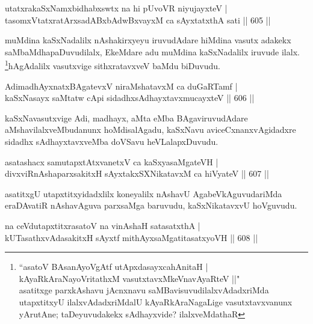 
\begin{shl}
utatxrakaSxNamxbidhabxswtx na hi pUvoVR niyujayxteV | \\
tasomxVtatxratArxsadABxbAdwBxvayxM ca sAyxtatxthA sati \hfill||  605 ||  
\end{shl}

\begin{artha}
muMdina kaSxNadalilx nAshakirxyeyu iruvudAdare hiMdina vasutx adakekx saMbaMdhapaDuvudilalx, EkeMdare adu muMdina kaSxNadalilx iruvude ilalx. \footnote[1]{``asatoV BAsanAyoVgAtf utApxdasayxcahAnitaH |\\
kAyaRkAraNayoVritathxM vasutxtavxMkeVnavAyaRteV ||"\\asatitxge parxkAshavu jAcnxnavu saMBavisuvudilalxvAdadxriMda utapxtitxyU ilalxvAdadxriMdalU kAyaRkAraNagaLige vasutxtavxvanunx yArutAne; taDeyuvudakekx sAdhayxvide? ilalxveMdathaR}hAgAdalilx vasutxvige sithxratavxveV baMdu biDuvudu.
\end{artha}

\begin{shl}
AdimadhAyxnatxBAgatevxV niraMshatavxM ca duGaRTamf | \\
kaSxNasayx saMtatw cApi sidadhxsAdhayxtavxmucayxteV \hfill||  606 ||  
\end{shl}

\begin{artha}
kaSxNavasutxvige Adi, madhayx, aMta eMba BAgaviruvudAdare aMshavilalxveMbudanunx hoMdisalAgadu, kaSxNavu aviceCxnanxvAgidadxre sidadhx sAdhayxtavxveMba doVSavu heVLalapxDuvudu.
\end{artha}

\begin{shl}
asatashacx samutapxtAtxvanetxV ca kaSxyasaMgateVH | \\
divxviRnAshaparxsakitxH sAyxtakxSXNikatavxM ca hiVyateV \hfill||  607 ||  
\end{shl}	

\begin{artha}
asatitxgU utapxtitxyidadxlilx koneyalilx nAshavU AgabeVkAguvudariMda eraDAvatiR nAshavAguva parxsaMga baruvudu, kaSxNikatavxvU hoVguvudu.
\end{artha}

\begin{shl}
na ceVdutapxtitxrasatoV na vinAshaH satasatxthA | \\
kUTasathxvAdasakitxH sAyxtf \footnotemark[1]mithAyxsaMgatitasatxyoVH \hfill||  608 ||  
\end{shl}

